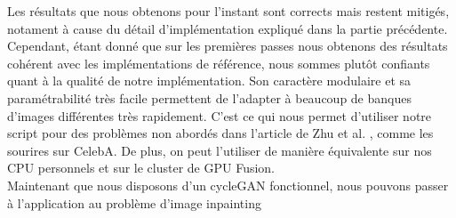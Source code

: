 Les résultats que nous obtenons pour l'instant sont corrects mais restent mitigés, notament à cause du détail d'implémentation expliqué dans la partie précédente. Cependant, étant donné que sur les premières passes nous obtenons des résultats cohérent avec les implémentations de référence, nous sommes plutôt confiants quant à la qualité de notre implémentation. Son caractère modulaire et sa paramétrabilité très facile permettent de l'adapter à beaucoup de banques d'images différentes très rapidement. C'est ce qui nous permet d'utiliser notre script pour des problèmes non abordés dans l'article de Zhu et al. \cite{zhu_unpaired_2018}, comme les sourires sur CelebA. De plus, on peut l'utiliser de manière équivalente sur nos CPU personnels et sur le cluster de GPU Fusion.\\

Maintenant que nous disposons d'un cycleGAN fonctionnel, nous pouvons passer à l'application au problème d'image inpainting